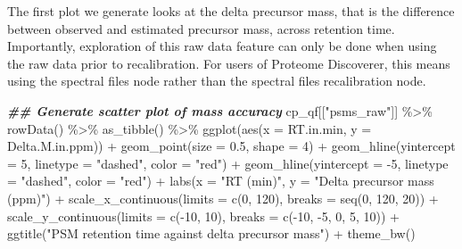 \documentclass[9pt,a4paper,]{extarticle}
\newenvironment{Shaded}{\begin{snugshade}}{\end{snugshade}}
\newcommand{\AttributeTok}[1]{\textcolor[rgb]{0.77,0.63,0.00}{#1}}
\newcommand{\DecValTok}[1]{\textcolor[rgb]{0.00,0.00,0.81}{#1}}
\newcommand{\DocumentationTok}[1]{\textcolor[rgb]{0.56,0.35,0.01}{\textbf{\textit{#1}}}}
\newcommand{\FloatTok}[1]{\textcolor[rgb]{0.00,0.00,0.81}{#1}}
\newcommand{\FunctionTok}[1]{\textcolor[rgb]{0.00,0.00,0.00}{#1}}
\newcommand{\NormalTok}[1]{#1}
\newcommand{\SpecialCharTok}[1]{\textcolor[rgb]{0.00,0.00,0.00}{#1}}
\newcommand{\StringTok}[1]{\textcolor[rgb]{0.31,0.60,0.02}{#1}}
\begin{document}
The first plot we generate looks at the delta precursor mass, that is the
difference between observed and estimated precursor mass, across retention time.
Importantly, exploration of this raw data feature can only be done when using
the raw data prior to recalibration. For users of Proteome Discoverer, this
means using the spectral files node rather than the spectral files recalibration
node.

\begin{Shaded}
\begin{Highlighting}[]
\DocumentationTok{\#\# Generate scatter plot of mass accuracy}
\NormalTok{cp\_qf[[}\StringTok{"psms\_raw"}\NormalTok{]] }\SpecialCharTok{\%\textgreater{}\%}
  \FunctionTok{rowData}\NormalTok{() }\SpecialCharTok{\%\textgreater{}\%} 
  \FunctionTok{as\_tibble}\NormalTok{() }\SpecialCharTok{\%\textgreater{}\%}
  \FunctionTok{ggplot}\NormalTok{(}\FunctionTok{aes}\NormalTok{(}\AttributeTok{x =}\NormalTok{ RT.in.min, }\AttributeTok{y =}\NormalTok{ Delta.M.in.ppm)) }\SpecialCharTok{+}
  \FunctionTok{geom\_point}\NormalTok{(}\AttributeTok{size =} \FloatTok{0.5}\NormalTok{, }\AttributeTok{shape =} \DecValTok{4}\NormalTok{) }\SpecialCharTok{+}
  \FunctionTok{geom\_hline}\NormalTok{(}\AttributeTok{yintercept =} \DecValTok{5}\NormalTok{, }\AttributeTok{linetype =} \StringTok{"dashed"}\NormalTok{, }\AttributeTok{color =} \StringTok{"red"}\NormalTok{) }\SpecialCharTok{+}
  \FunctionTok{geom\_hline}\NormalTok{(}\AttributeTok{yintercept =} \SpecialCharTok{{-}}\DecValTok{5}\NormalTok{, }\AttributeTok{linetype =} \StringTok{"dashed"}\NormalTok{, }\AttributeTok{color =} \StringTok{"red"}\NormalTok{) }\SpecialCharTok{+}
  \FunctionTok{labs}\NormalTok{(}\AttributeTok{x =} \StringTok{"RT (min)"}\NormalTok{, }\AttributeTok{y =} \StringTok{"Delta precursor mass (ppm)"}\NormalTok{) }\SpecialCharTok{+}
  \FunctionTok{scale\_x\_continuous}\NormalTok{(}\AttributeTok{limits =} \FunctionTok{c}\NormalTok{(}\DecValTok{0}\NormalTok{, }\DecValTok{120}\NormalTok{), }\AttributeTok{breaks =} \FunctionTok{seq}\NormalTok{(}\DecValTok{0}\NormalTok{, }\DecValTok{120}\NormalTok{, }\DecValTok{20}\NormalTok{)) }\SpecialCharTok{+}
  \FunctionTok{scale\_y\_continuous}\NormalTok{(}\AttributeTok{limits =} \FunctionTok{c}\NormalTok{(}\SpecialCharTok{{-}}\DecValTok{10}\NormalTok{, }\DecValTok{10}\NormalTok{), }\AttributeTok{breaks =} \FunctionTok{c}\NormalTok{(}\SpecialCharTok{{-}}\DecValTok{10}\NormalTok{, }\SpecialCharTok{{-}}\DecValTok{5}\NormalTok{, }\DecValTok{0}\NormalTok{, }\DecValTok{5}\NormalTok{, }\DecValTok{10}\NormalTok{)) }\SpecialCharTok{+}
  \FunctionTok{ggtitle}\NormalTok{(}\StringTok{"PSM retention time against delta precursor mass"}\NormalTok{) }\SpecialCharTok{+}
  \FunctionTok{theme\_bw}\NormalTok{()}
\end{Highlighting}
\end{Shaded}
\end{document}
